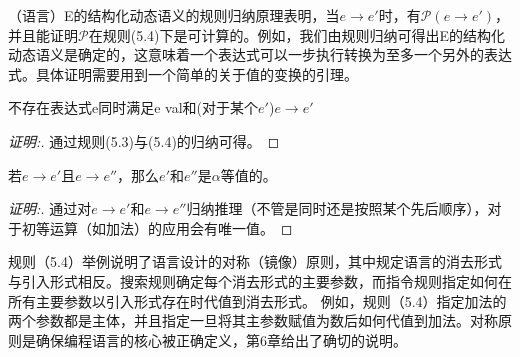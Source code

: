 \par{（语言）E的结构化动态语义的规则归纳原理表明，当$e\rightarrow e'$时，有$\mathcal{P}(e\rightarrow e')$，并且能证明$\mathcal{P}$在规则(5.4)下是可计算的。例如，我们由规则归纳可得出E的结构化动态语义是确定的，这意味着一个表达式可以一步执行转换为至多一个另外的表达式。具体证明需要用到一个简单的关于值的变换的引理。
\begin{lemma}[值的终态性] 不存在表达式e同时满足e val和(对于某个$e'$)$e\rightarrow e'$
\end{lemma}
\begin{proof}[证明:]
通过规则(5.3)与(5.4)的归纳可得。
 \end{proof}
 \begin{lemma}[唯一性] 若$e\rightarrow e'$且$e\rightarrow e''$，那么$e'$和$e''$是$\alpha$等值的。
\end{lemma}
\begin{proof}[证明:]
通过对$e\rightarrow e'$和$e\rightarrow e''$归纳推理（不管是同时还是按照某个先后顺序），对于初等运算（如加法）的应用会有唯一值。
 \end{proof}
}
\par{规则（5.4）举例说明了语言设计的对称（镜像）原则，其中规定语言的消去形式与引入形式相反。搜索规则确定每个消去形式的主要参数，而指令规则指定如何在所有主要参数以引入形式存在时代值到消去形式。 例如，规则（5.4）指定加法的两个参数都是主体，并且指定一旦将其主参数赋值为数后如何代值到加法。对称原则是确保编程语言的核心被正确定义，第6章给出了确切的说明。
}
